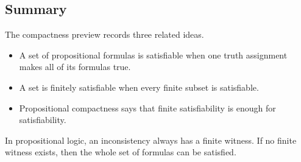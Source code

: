 \subsection*{Summary}

\begin{remark*}
The compactness preview records three related ideas.

\begin{itemize}
\item A set of propositional formulas is satisfiable when one truth assignment
makes all of its formulas true.
\item A set is finitely satisfiable when every finite subset is satisfiable.
\item Propositional compactness says that finite satisfiability is enough for
satisfiability.
\end{itemize}
\end{remark*}

\begin{remark*}
In propositional logic, an inconsistency always has a finite witness. If no
finite witness exists, then the whole set of formulas can be satisfied.
\end{remark*}
